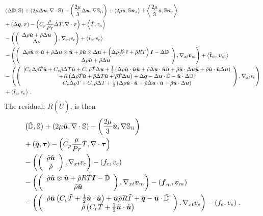 \documentclass[Proposal.tex]{subfiles}
\begin{document}
\begin{equation}
\label{eq:compressibleJacobian}
\begin{aligned}
	&\LRp{\Delta\mathbb{D},\mathbb{S}}+\LRp{2\mu\Delta\bfu,\Div\mathbb{S}}-\LRp{\frac{2\mu}{3}\Delta\bfu,\Grad\mathbb{S}_{ii}}
	+\LRa{2\mu\hat u,\mathbb{S}\bfn_x}+\LRa{\frac{2\mu}{3}\hat u,\mathbb{S}\bfn_x}\\
	&+\LRp{\Delta\bfq,\bftau}-\LRp{C_p\frac{\mu}{Pr}\Delta T,\Div\bftau}+\LRa{\hat T,\tau_n}\\
	&-\LRp{\vecttwo{\Delta\rho\tilde\bfu+\tilde\rho\Delta\bfu}
	{\Delta\rho},\Gradxt v_c}
	+\LRa{\hat t_c,v_c}\\
	&-\LRp{\vecttwo{\Delta\rho\tilde\bfu\otimes\tilde\bfu+\tilde\rho\Delta\bfu\otimes\tilde\bfu+\tilde\rho\tilde\bfu\otimes\Delta\bfu
	+\LRp{\Delta\rho\frac{R}{C_v}\tilde e+\tilde\rho RT}\bfI-\Delta\mathbb{D}}
	{\Delta\rho\tilde\bfu+\tilde\rho\Delta\bfu},\Gradxt\bfv_m}
	+\LRa{\hat\bft_m,\bfv_m}\\
	&-\LRp{\vectthree{[C_v\Delta\rho\tilde T\tilde\bfu+C_v\tilde\rho\Delta T\tilde\bfu+C_v\tilde\rho\tilde T\Delta\bfu
	+\frac{1}{2}\LRp{\Delta\rho\tilde\bfu\cdot\tilde\bfu\tilde\bfu+\tilde\rho\Delta\bfu\cdot\tilde\bfu\tilde\bfu
	+\tilde\rho\tilde\bfu\cdot\Delta\bfu\tilde\bfu+\tilde\rho\tilde\bfu\cdot\tilde\bfu\Delta\bfu}}
	{+R\LRp{\Delta\rho\tilde T\tilde\bfu+\tilde\rho\Delta T\tilde\bfu+\tilde\rho\tilde T\Delta\bfu}
	+\Delta\bfq-\Delta\bfu\cdot\tilde{\mathbb{D}}-\tilde\bfu\cdot\Delta\mathbb{D}]}
	{C_v\Delta\rho\tilde T+C_v\tilde\rho\Delta T
	+\frac{1}{2}\LRp{\Delta\rho\tilde\bfu\cdot\tilde\bfu+\tilde\rho\Delta\bfu\cdot\tilde\bfu+\tilde\rho\tilde\bfu\cdot\Delta\bfu}},\Gradxt v_e}\\
	&+\LRa{\hat t_e,v_e}\,.
\end{aligned}
\end{equation}
The residual, $R(\tilde U)$, is then
\begin{equation}
\begin{aligned}
	&\left( \tilde{\mathbb{D}},\mathbb{S} \right)+\left( 2\mu\tilde{\boldsymbol u},\nabla\cdot\mathbb{S} \right)-\left( \frac{2\mu}{3}\tilde{\boldsymbol u},\nabla\mathbb{S}_{ii} \right)\\
	&+\left( \tilde{\boldsymbol q},\boldsymbol\tau \right)-\left( C_p\frac{\mu}{Pr}\tilde T,\nabla\cdot\boldsymbol\tau \right)\\
	&-\left( \left( \begin{array}{c} \tilde\rho\tilde{\boldsymbol u}\\ \tilde\rho\\ \end{array} \right),\nabla_{xt} v_c \right)-\left( f_c,v_c \right)\\
	&-\left( \left( \begin{array}{c} \tilde\rho\tilde{\boldsymbol u}\otimes\tilde{\boldsymbol u}+\tilde\rho R\tilde T\boldsymbol I-\tilde{\mathbb{D}}\\ \tilde\rho\tilde{\boldsymbol u}\\ \end{array} \right),
	\nabla_{xt}\boldsymbol v_m \right)-\left( \boldsymbol f_m,\boldsymbol v_m \right)\\
	&-\left( \left( \begin{array}{c} \tilde\rho\tilde{\boldsymbol u}\left( C_v\tilde T+\frac{1}{2}\tilde{\boldsymbol u}\cdot\tilde{\boldsymbol u} \right)+\tilde{\boldsymbol u}\tilde\rho R\tilde T
	+\tilde{\boldsymbol q}-\tilde{\boldsymbol u}\cdot\tilde{\mathbb{D}}\\ \tilde\rho\left( C_v\tilde T+\frac{1}{2}\tilde{\boldsymbol u}\cdot\tilde{\boldsymbol u} \right)\\ \end{array} \right),
	\nabla_{xt} v_e \right)-\left( f_e,v_e \right)\,.
\end{aligned}
\end{equation}
\end{document}
